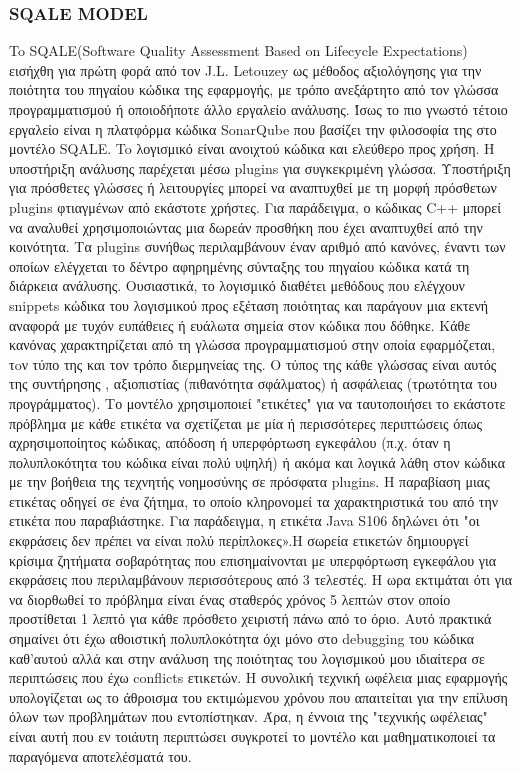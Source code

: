 \documentclass[a4paper, 11pt]{article}
\begin{document}
{{\subsubsection{\textlatin{SQALE MODEL}}

To \textlatin{SQALE(Software Quality Assessment Based on Lifecycle Expectations)}
εισήχθη για πρώτη φορά από τον \textlatin{J.L. Letouzey} ως μέθοδος αξιολόγησης για 
την ποιότητα του πηγαίου κώδικα της εφαρμογής, με τρόπο ανεξάρτητο από τον γλώσσα προγραμματισμού
ή οποιοδήποτε άλλο εργαλείο ανάλυσης. Ίσως το πιο γνωστό τέτοιο εργαλείο είναι η πλατφόρμα κώδικα \textlatin{SonarQube}
που βασίζει την φιλοσοφία της στο μοντέλο \textlatin{SQALE}. To λογισμικό είναι ανοιχτού κώδικα και ελεύθερο προς χρήση.
Η υποστήριξη ανάλυσης παρέχεται μέσω plugins για συγκεκριμένη γλώσσα.
Υποστήριξη για πρόσθετες γλώσσες ή λειτουργίες
μπορεί να αναπτυχθεί με τη μορφή πρόσθετων plugins φτιαγμένων από εκάστοτε χρήστες. Για παράδειγμα, ο κώδικας \textlatin{C++} μπορεί να αναλυθεί
χρησιμοποιώντας μια δωρεάν προσθήκη που έχει αναπτυχθεί από την κοινότητα. Τα \textlatin{plugins} συνήθως περιλαμβάνουν έναν αριθμό από
κανόνες, έναντι των οποίων ελέγχεται το δέντρο αφηρημένης σύνταξης του πηγαίου κώδικα κατά τη διάρκεια
ανάλυσης. Ουσιαστικά, το λογισμικό διαθέτει μεθόδους που ελέγχουν snippets κώδικα του λογισμικού προς εξέταση ποιότητας και παράγουν μια εκτενή αναφορά με τυχόν ευπάθειες ή ευάλωτα σημεία στον κώδικα που δόθηκε. Κάθε κανόνας χαρακτηρίζεται από τη γλώσσα προγραμματισμού στην οποία εφαρμόζεται, τoν τύπο της
και τον τρόπο διερμηνείας της. Ο τύπος της κάθε γλώσσας είναι αυτός της  συντήρησης , αξιοπιστίας (πιθανότητα σφάλματος) ή ασφάλειας (τρωτότητα του προγράμματος). Το μοντέλο χρησιμοποιεί "ετικέτες" για να ταυτοποιήσει το εκάστοτε πρόβλημα
με κάθε ετικέτα να σχετίζεται με μία ή περισσότερες περιπτώσεις όπως
 αχρησιμοποίητος κώδικας, απόδοση ή υπερφόρτωση εγκεφάλου (π.χ. όταν η πολυπλοκότητα του κώδικα είναι πολύ υψηλή) ή ακόμα και λογικά λάθη στον κώδικα με την βοήθεια της τεχνητής νοημοσύνης σε πρόσφατα \textlatin{plugins}.
Η παραβίαση μιας ετικέτας οδηγεί σε ένα ζήτημα, το οποίο κληρονομεί τα χαρακτηριστικά του από την
ετικέτα που παραβιάστηκε. Για παράδειγμα, η ετικέτα \textlatin{Java S106} δηλώνει ότι "οι εκφράσεις
δεν πρέπει να είναι πολύ περίπλοκες».Η σωρεία ετικετών δημιουργεί κρίσιμα ζητήματα σοβαρότητας που επισημαίνονται
με υπερφόρτωση εγκεφάλου για εκφράσεις που περιλαμβάνουν περισσότερους από 3 τελεστές. Η ωρα
εκτιμάται ότι για να διορθωθεί το πρόβλημα είναι ένας σταθερός χρόνος 5 λεπτών στον οποίο προστίθεται 1 λεπτό
για κάθε πρόσθετο χειριστή πάνω από το όριο. Αυτό πρακτικά σημαίνει ότι έχω αθοιστική πολυπλοκότητα όχι μόνο στο debugging του 
κώδικα καθ'αυτού αλλά και στην ανάλυση της ποιότητας του λογισμικού μου ιδιαίτερα σε περιπτώσεις που έχω \textlatin{conflicts} ετικετών.
H συνολική τεχνική ωφέλεια μιας εφαρμογής υπολογίζεται ως το άθροισμα του εκτιμώμενου
χρόνου που απαιτείται για την επίλυση όλων των προβλημάτων που εντοπίστηκαν. Άρα, η έννοια της "τεχνικής ωφέλειας" είναι αυτή που εν τοιάυτη περιπτώσει συγκροτεί το μοντέλο και μαθηματικοποιεί τα παραγόμενα αποτελέσματά του.

}}
\end{document}
